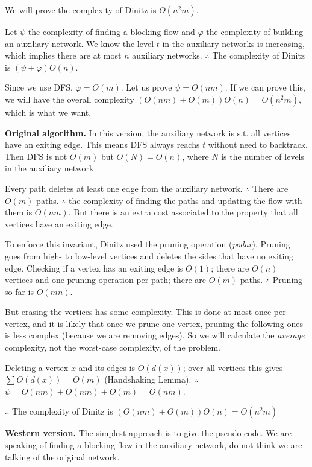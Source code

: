 \documentclass[a4paper, 12pt]{article}
\begin{document}
We will prove the complexity of Dinitz is $O(n^2m)$.

Let $\psi$ the complexity of finding a blocking flow and $\varphi$ the
complexity of building an auxiliary network. We know the level $t$ in the
auxiliary networks is increasing, which implies there are at most $n$ auxiliary
networks. $\therefore $ The complexity of Dinitz is $\left( \psi + \varphi
\right) O(n) $.

Since we use DFS, $\varphi = O(m)$. Let us prove $\psi = O(nm)$. If we can
prove this, we will have the overall complexity $\left( O(nm) + O(m) \right)
O(n) = O(n^2m) $, which is what we want.

\textbf{Original algorithm.} In this version, the auxiliary network is s.t. all
vertices have an exiting edge. This means DFS always reachs $t$ without need to
backtrack. Then DFS is not $O(m)$ but $O(N) = O(n)$, where $N$ is the number of
levels in the auxiliary network.

Every path deletes at least one edge from the auxiliary network. $\therefore $
There are $O(m)$ paths.  $\therefore $ the complexity of finding the 
paths and updating the flow with them is $O(nm)$. But there is 
an extra cost associated to the property that all vertices have an 
exiting edge.

To enforce this invariant, Dinitz used the pruning operation (\textit{podar}).
Pruning goes from high- to low-level vertices and deletes the sides that have
no exiting edge. Checking if a vertex has an exiting edge is $O(1)$; there are
$O(n)$ vertices and one pruning operation per path; there are $O(m)$ paths.
$\therefore $ Pruning so far is $O(mn)$.

But erasing the vertices has some complexity. This is done at most once per
vertex, and it is likely that once we prune one vertex, pruning the following
ones is less complex (because we are removing edges). So we will calculate the
\textit{average} complexity, not the worst-case complexity, of the problem.

Deleting a vertex $x$ and its edges is $O(d(x))$; over all vertices this gives
$\sum O(d(x)) = O(m)$ (Handshaking Lemma).  $\therefore $ $\psi = O(nm) + O(nm)
+ O(m)= O(nm)$.

$\therefore $ The complexity of Dinitz is $\left( O(nm) + O(m) \right)O(n) = O(n^2m) $

\textbf{Western version.} The simplest approach is to give the pseudo-code. We
are speaking of finding a blocking flow in the auxiliary network, do not think
we are talking of the original network.
\end{document}

